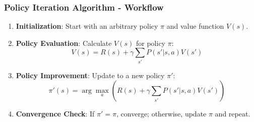 \documentclass{beamer}
\begin{document}
\begin{frame}[fragile]
    \frametitle{Policy Iteration Algorithm - Workflow}
    \begin{enumerate}
        \item \textbf{Initialization}: 
            Start with an arbitrary policy \( \pi \) and value function \( V(s) \).
        
        \item \textbf{Policy Evaluation}:
            Calculate \( V(s) \) for policy \( \pi \):
            \begin{equation}
                V(s) = R(s) + \gamma \sum_{s'} P(s' | s, a)V(s')
            \end{equation}
            
        \item \textbf{Policy Improvement}:
            Update to a new policy \( \pi' \):
            \begin{equation}
                \pi'(s) = \arg\max_a \left( R(s) + \gamma \sum_{s'} P(s' | s, a)V(s') \right)
            \end{equation}
        
        \item \textbf{Convergence Check}:
            If \( \pi' = \pi \), converge; otherwise, update \( \pi \) and repeat.
    \end{enumerate}
\end{frame}
\end{document}
